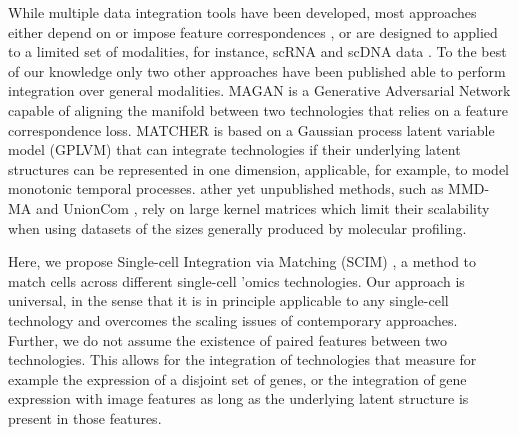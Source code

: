 While multiple data integration tools have been developed, most approaches either depend on or impose feature correspondences \cite{stuart2019,welch2019}, or are designed to applied to a limited set of modalities, for instance, scRNA and scDNA data \cite{campbell2019,mccarthy2020}.
To the best of our knowledge only two other approaches have been published \cite{amodio2018,welch2017} able to perform integration over general modalities.
MAGAN \cite{amodio2018} is a Generative Adversarial Network capable of aligning the manifold between two technologies that relies on a feature correspondence loss.
MATCHER \cite{welch2017} is based on a Gaussian process latent variable model (GPLVM) \cite{lawrence2004} that can integrate technologies if their underlying latent structures can be represented in one dimension, applicable, for example, to model monotonic temporal processes.
ather yet unpublished methods, such as MMD-MA \cite{liu2019} and UnionCom \cite{cao2020}, rely on large kernel matrices which limit their scalability when using datasets of the sizes generally produced by molecular profiling.

Here, we propose Single-cell Integration via Matching (SCIM) \cite{stark2021}, a method to match cells across different single-cell ’omics technologies.
Our approach is universal, in the sense that it is in principle applicable to any single-cell technology and overcomes the scaling issues of contemporary approaches.
Further, we do not assume the existence of paired features between two technologies.
This allows for the integration of technologies that measure for example the expression of a disjoint set of genes, or the integration of gene expression with image features as long as the underlying latent structure is present in those features.
